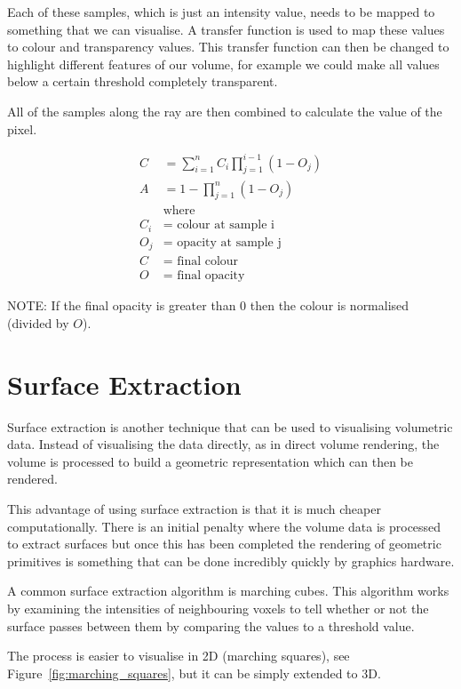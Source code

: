 Each of these samples, which is just an intensity value, needs to be mapped to something that we can visualise. A transfer function is used to map these values to colour and transparency values. This transfer function can then be changed to highlight different features of our volume, for example we could make all values below a certain threshold completely transparent.

All of the samples along the ray are then combined to calculate the value of the pixel.

\begin{align*}
	C &= \sum\limits_{i=1}^n C_{i}\prod\limits_{j=1}^{i-1}(1 - O_j) \\
	A &= 1 - \prod\limits_{j=1}^n(1 - O_j) \\
	& \text{where} \\
	C_i &= \text{ colour at sample i} \\
	O_j &= \text{ opacity at sample j} \\
	C &= \text{ final colour} \\
	O &= \text{ final opacity}
\end{align*}

NOTE: If the final opacity is greater than 0 then the colour is normalised (divided by $O$).

\newpage
\section{Surface Extraction}
Surface extraction is another technique that can be used to visualising volumetric data. Instead of visualising the data directly, as in direct volume rendering, the volume is processed to build a geometric representation which can then be rendered.

This advantage of using surface extraction is that it is much cheaper computationally\cite{surfacevsvolumerendering}. There is an initial penalty where the volume data is processed to extract surfaces but once this has been completed the rendering of geometric primitives is something that can be done incredibly quickly by graphics hardware.

A common surface extraction algorithm is marching cubes. This algorithm works by examining the intensities of neighbouring voxels to tell whether or not the surface passes between them by comparing the values to a threshold value. 

The process is easier to visualise in 2D (marching squares), see Figure~\ref{fig:marching_squares}, but it can be simply extended to 3D.

